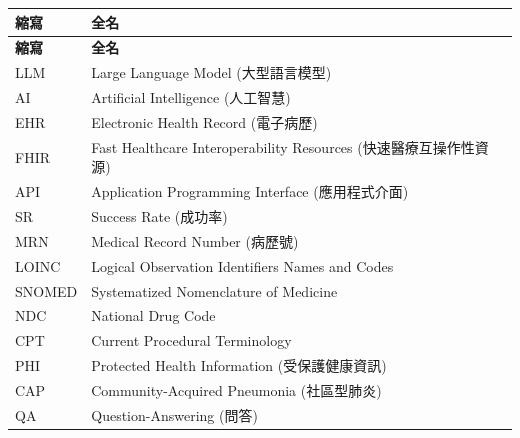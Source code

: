 \documentclass[12pt,a4paper]{article}
\begin{document}
\begin{longtable}{p{4cm}p{10cm}}
\toprule
\textbf{縮寫} & \textbf{全名} \\
\midrule
\endfirsthead

\toprule
\textbf{縮寫} & \textbf{全名} \\
\midrule
\endhead

\bottomrule
\endfoot

LLM & Large Language Model (大型語言模型) \\
AI & Artificial Intelligence (人工智慧) \\
EHR & Electronic Health Record (電子病歷) \\
FHIR & Fast Healthcare Interoperability Resources (快速醫療互操作性資源) \\
API & Application Programming Interface (應用程式介面) \\
SR & Success Rate (成功率) \\
MRN & Medical Record Number (病歷號) \\
LOINC & Logical Observation Identifiers Names and Codes \\
SNOMED & Systematized Nomenclature of Medicine \\
NDC & National Drug Code \\
CPT & Current Procedural Terminology \\
PHI & Protected Health Information (受保護健康資訊) \\
CAP & Community-Acquired Pneumonia (社區型肺炎) \\
QA & Question-Answering (問答) \\
\bottomrule
\end{longtable}
\end{document}
